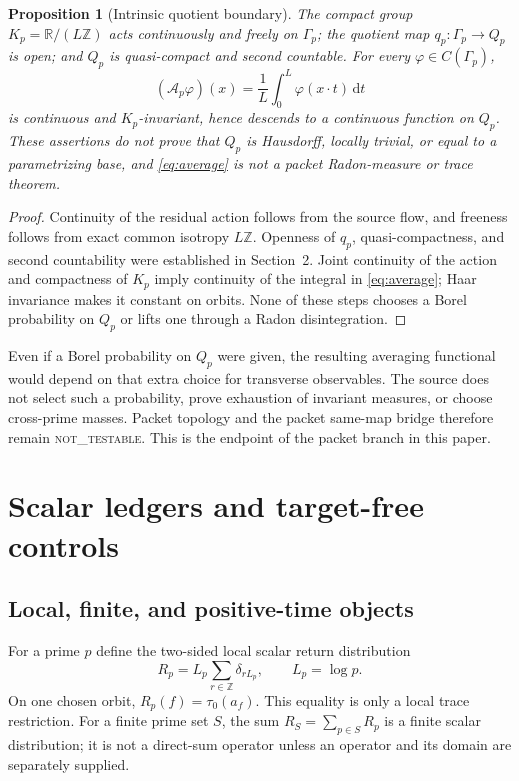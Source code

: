 \documentclass[11pt]{article}
\newtheorem{proposition}[theorem]{Proposition}
\theoremstyle{definition}
\newcommand{\R}{\mathbb{R}}
\newcommand{\Z}{\mathbb{Z}}
\newcommand{\dd}{\,\mathrm{d}}
\newcommand{\NOTTESTABLE}{\textsc{not\_testable}}
\begin{document}
\begin{proposition}[Intrinsic quotient boundary]\label{prop:quotient}
The compact group \(K_p=\R/(L\Z)\) acts continuously and freely on \(\Gamma_p\); the quotient map \(q_p:\Gamma_p\to Q_p\) is open; and \(Q_p\) is quasi-compact and second countable.  For every \(\varphi\in C(\Gamma_p)\),
\begin{equation}
 (\mathcal A_p\varphi)(x)=\frac1L\int_0^L\varphi(x\cdot t)\dd t\label{eq:average}
\end{equation}
is continuous and \(K_p\)-invariant, hence descends to a continuous function on \(Q_p\).  These assertions do not prove that \(Q_p\) is Hausdorff, locally trivial, or equal to a parametrizing base, and \eqref{eq:average} is not a packet Radon-measure or trace theorem.
\end{proposition}

\begin{proof}
Continuity of the residual action follows from the source flow, and freeness follows from exact common isotropy \(L\Z\).  Openness of \(q_p\), quasi-compactness, and second countability were established in Section~2.  Joint continuity of the action and compactness of \(K_p\) imply continuity of the integral in \eqref{eq:average}; Haar invariance makes it constant on orbits.  None of these steps chooses a Borel probability on \(Q_p\) or lifts one through a Radon disintegration.
\end{proof}

Even if a Borel probability on \(Q_p\) were given, the resulting averaging functional would depend on that extra choice for transverse observables.  The source does not select such a probability, prove exhaustion of invariant measures, or choose cross-prime masses.  Packet topology and the packet same-map bridge therefore remain \NOTTESTABLE.  This is the endpoint of the packet branch in this paper.

\section{Scalar ledgers and target-free controls}

\subsection{Local, finite, and positive-time objects}

For a prime \(p\) define the two-sided local scalar return distribution
\begin{equation}
 R_p=L_p\sum_{r\in\Z}\delta_{rL_p},\qquad L_p=\log p.\label{eq:Rp}
\end{equation}
On one chosen orbit, \(R_p(f)=\tau_0(a_f)\).  This equality is only a local trace restriction.  For a finite prime set \(S\), the sum \(R_S=\sum_{p\in S}R_p\) is a finite scalar distribution; it is not a direct-sum operator unless an operator and its domain are separately supplied.
\end{document}
